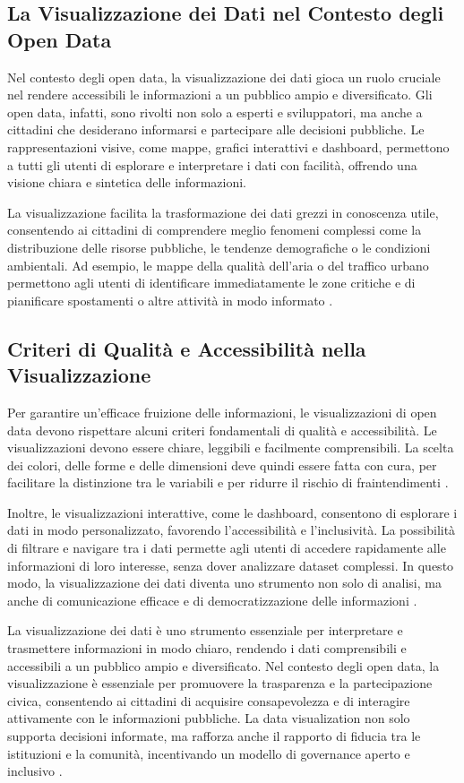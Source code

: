 \subsection{La Visualizzazione dei Dati nel Contesto degli Open Data}

Nel contesto degli open data, la visualizzazione dei dati gioca un ruolo cruciale nel rendere accessibili le informazioni a un pubblico ampio e diversificato. Gli open data, infatti, sono rivolti non solo a esperti e sviluppatori, ma anche a cittadini che desiderano informarsi e partecipare alle decisioni pubbliche. Le rappresentazioni visive, come mappe, grafici interattivi e dashboard, permettono a tutti gli utenti di esplorare e interpretare i dati con facilità, offrendo una visione chiara e sintetica delle informazioni.

La visualizzazione facilita la trasformazione dei dati grezzi in conoscenza utile, consentendo ai cittadini di comprendere meglio fenomeni complessi come la distribuzione delle risorse pubbliche, le tendenze demografiche o le condizioni ambientali. Ad esempio, le mappe della qualità dell'aria o del traffico urbano permettono agli utenti di identificare immediatamente le zone critiche e di pianificare spostamenti o altre attività in modo informato \cite{Kitchin2014}.

\subsection{Criteri di Qualità e Accessibilità nella Visualizzazione}

Per garantire un'efficace fruizione delle informazioni, le visualizzazioni di open data devono rispettare alcuni criteri fondamentali di qualità e accessibilità. Le visualizzazioni devono essere chiare, leggibili e facilmente comprensibili. La scelta dei colori, delle forme e delle dimensioni deve quindi essere fatta con cura, per facilitare la distinzione tra le variabili e per ridurre il rischio di fraintendimenti \cite{Few2013}.

Inoltre, le visualizzazioni interattive, come le dashboard, consentono di esplorare i dati in modo personalizzato, favorendo l'accessibilità e l’inclusività. La possibilità di filtrare e navigare tra i dati permette agli utenti di accedere rapidamente alle informazioni di loro interesse, senza dover analizzare dataset complessi. In questo modo, la visualizzazione dei dati diventa uno strumento non solo di analisi, ma anche di comunicazione efficace e di democratizzazione delle informazioni \cite{OECD2020}.

La visualizzazione dei dati è uno strumento essenziale per interpretare e trasmettere informazioni in modo chiaro, rendendo i dati comprensibili e accessibili a un pubblico ampio e diversificato. Nel contesto degli open data, la visualizzazione è essenziale per promuovere la trasparenza e la partecipazione civica, consentendo ai cittadini di acquisire consapevolezza e di interagire attivamente con le informazioni pubbliche. La data visualization non solo supporta decisioni informate, ma rafforza anche il rapporto di fiducia tra le istituzioni e la comunità, incentivando un modello di governance aperto e inclusivo \cite{Few2013}.